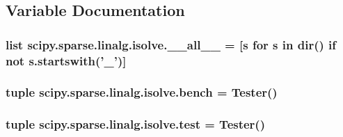 \subsection{Variable Documentation}
\hypertarget{namespacescipy_1_1sparse_1_1linalg_1_1isolve_a1cd138cd71c60fbb3413daa461d33556}{}
\subsubsection[{\+\_\+\+\_\+all\+\_\+\+\_\+}]{\setlength{\rightskip}{0pt plus 5cm}list scipy.\+sparse.\+linalg.\+isolve.\+\_\+\+\_\+all\+\_\+\+\_\+ = \mbox{[}{\bf s} for {\bf s} in dir() {\bf if} not s.\+startswith('\+\_\+')\mbox{]}}\label{namespacescipy_1_1sparse_1_1linalg_1_1isolve_a1cd138cd71c60fbb3413daa461d33556}
\hypertarget{namespacescipy_1_1sparse_1_1linalg_1_1isolve_add33126c2d7e05af5c9a948cb79a320e}{}
\subsubsection[{bench}]{\setlength{\rightskip}{0pt plus 5cm}tuple scipy.\+sparse.\+linalg.\+isolve.\+bench = Tester()}\label{namespacescipy_1_1sparse_1_1linalg_1_1isolve_add33126c2d7e05af5c9a948cb79a320e}
\hypertarget{namespacescipy_1_1sparse_1_1linalg_1_1isolve_a2a4b2169cb9c00deb13f9ac56610c514}{}
\subsubsection[{test}]{\setlength{\rightskip}{0pt plus 5cm}tuple scipy.\+sparse.\+linalg.\+isolve.\+test = Tester()}\label{namespacescipy_1_1sparse_1_1linalg_1_1isolve_a2a4b2169cb9c00deb13f9ac56610c514}
